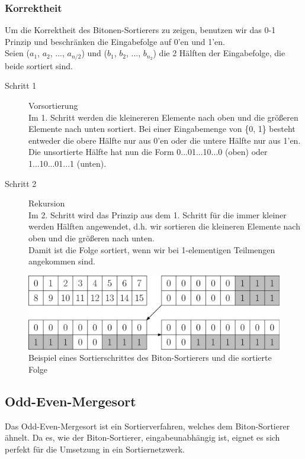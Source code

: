\documentclass[11pt,ngerman]{article}
\begin{document}
\subsubsection{Korrektheit}
Um die Korrektheit des Bitonen-Sortierers zu zeigen, benutzen wir das 0-1 Prinzip und beschränken die Eingabefolge auf 0'en und 1'en.\\
Seien ($a_1$, $a_2$, ..., $a_{n/2}$) und ($b_1$, $b_2$, ..., $b_{n_2}$) die 2 Hälften der Eingabefolge, die beide sortiert sind.
\begin{description}
\item[Schritt 1] Vorsortierung\\Im 1. Schritt werden die kleinereren Elemente nach \glqq oben\grqq{} und die größeren Elemente nach \glqq unten\grqq{} sortiert. Bei einer Eingabemenge von \{0, 1\} besteht entweder die \glqq obere\grqq{} Hälfte nur aus 0'en oder die \grqq untere\grqq{} Hälfte nur aus 1'en.\\ Die unsortierte Hälfte hat nun die Form 0...01...10...0 (\glqq oben\grqq ) oder 1...10...01...1 (\glqq unten\grqq ).
\item[Schritt 2] \glqq Rekursion\grqq{}\\Im 2. Schritt wird das Prinzip aus dem 1. Schritt für die immer kleiner werden Hälften angewendet, d.h. wir sortieren die kleineren Elemente nach \grqq oben\grqq{} und die größeren nach \grqq unten\grqq{}.\\
Damit ist die Folge sortiert, wenn wir bei 1-elementigen Teilmengen angekommen sind. 
\end{description}
\FloatBarrier
\begin{figure}[!hb]
\begin{center}
\includegraphics[scale=0.45]{korrektheitBS.eps}
\caption{Beispiel eines Sortierschrittes des Biton-Sortierers und die sortierte Folge}
\end{center}
\end{figure}
\FloatBarrier
\subsection{Odd-Even-Mergesort}
Das Odd-Even-Mergesort ist ein Sortierverfahren, welches dem Biton-Sortierer ähnelt. Da es, wie der Biton-Sortierer, eingabeunabhängig ist, eignet es sich perfekt für die Umsetzung in ein Sortiernetzwerk.
\end{document}
